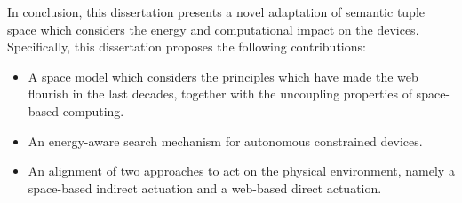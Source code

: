 \begin{abstracts}
In conclusion, this dissertation presents a novel adaptation of semantic tuple space which considers the energy and computational impact on the devices.
Specifically, this dissertation proposes the following contributions:
\begin{itemize}
  \item A space model which considers the principles which have made the web flourish in the last decades, together with the uncoupling properties of space-based computing.
  \item An energy-aware search mechanism for autonomous constrained devices.
  \item An alignment of two approaches to act on the physical environment, namely a space-based indirect actuation and a web-based direct actuation.
\end{itemize}

\end{abstracts}




